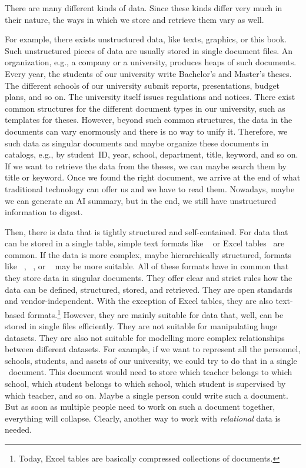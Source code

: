 \hsection{}%
%
%
There are many different kinds of data.%
Since these kinds differ very much in their nature, the ways in which we store and retrieve them vary as well.

For example, there exists unstructured data, like texts, graphics, or this book.
Such unstructured pieces of data are usually stored in single document files.
An organization, e.g., a company or a university, produces heaps of such documents.
Every year, the students of our university write Bachelor's and Master's theses.
The different schools of our university submit reports, presentations, budget plans, and so on.
The university itself issues regulations and notices.
There exist common structures for the different document types in our university, such as templates for theses.
However, beyond such common structures, the data in the documents can vary enormously and there is no way to unify it.
Therefore, we  such data as singular documents and maybe organize these documents in catalogs, e.g., by student~ID, year, school, department, title, keyword, and so on.
If we want to retrieve the data from the theses, we can maybe search them by title or keyword.
Once we found the right document, we arrive at the end of what traditional technology can offer us and we have to read them.
Nowadays, maybe we can generate an AI summary, but in the end, we still have unstructured information to digest.

Then, there is data that is tightly structured and self-contained.
For data that can be stored in a single table, simple text formats like ~\cite{S2005CFAMTFCSVCF} or Excel tables~\cite{B2023DMWME,G2024ECRFMME} are common.
If the data is more complex, maybe hierarchically structured, formats like ~\cite{BPSMM2008EMLX1FE,K2019ITXJY,CH2013XFCAMLTMC}, ~\cite{E2017SE4TJDIS,B2017TJONJDIF}, or ~\cite{DNMAASBE2021YAMLYV1,K2019ITXJY,CGTYB2022YFFDCAIE} may be more suitable.
All of these formats have in common that they store data in singular documents.
They offer clear and strict rules how the data can be defined, structured, stored, and retrieved.
They are open standards and vendor-independent.
With the exception of Excel tables, they are also text-based formats.\footnote{%
Today, Excel tables are basically compressed collections of  documents.%
} %
However, they are mainly suitable for data that, well, can be stored in single files efficiently.
They are not suitable for manipulating huge datasets.
They are also not suitable for modelling more complex relationships between different datasets.
For example, if we want to represent all the personnel, schools, students, and assets of our university, we could try to do that in a single ~document.
This document would need to store which teacher belongs to which school, which student belongs to which school, which student is supervised by which teacher, and so on.
Maybe a single person could write such a document.
But as soon as multiple people need to work on such a document together, everything will collapse.
Clearly, another way to work with \emph{relational} data is needed.

